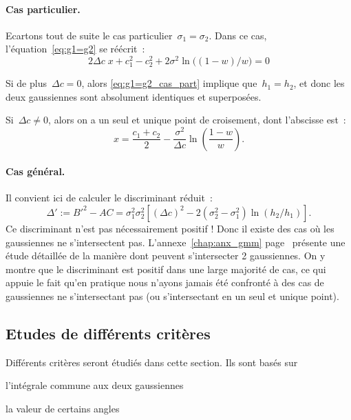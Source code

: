 \documentclass[main.tex]{subfiles}
\begin{document}
\paragraph{Cas particulier. \label{para:cas_partic_polynome}}
Ecartons tout de suite le cas particulier~$\sigma_1=\sigma_2$. %
Dans ce cas, l'équation~\eqref{eq:g1=g2} se réécrit~:
\begin{equation}
\label{eq:g1=g2_cas_part}
2\Delta c \; x + c_1^2-c_2^2 +  2 \sigma^2 \ln \big( (1-w) / w \big) = 0
\end{equation}
\begin{myitemize}
\item Si de plus~$\Delta c=0$, alors \eqref{eq:g1=g2_cas_part} implique que~$h_1=h_2$, et donc les deux gaussiennes sont absolument identiques et superposées.
\item Si~$\Delta c\neq0$, alors on a un seul et unique point de croisement, dont l'abscisse est~:
\begin{equation}
\label{eq:pt_croisement_unique}
x=\dfrac{c_1+c_2}{2}-\dfrac{\sigma^2}{\Delta c}\ln \left( \dfrac{1-w}{w} \right).
\end{equation}
\end{myitemize}
\paragraph{Cas général.} Il convient ici de calculer le discriminant réduit~:
\begin{equation}
\label{eq:discr_reduit}
\Delta' := B'^2 - AC = \sigma_1^2 \sigma_2^2 \left[ (\Delta c)^2 - 2(\sigma_2^2-\sigma_1^2) \ln (h_2/h_1)  \right].
\end{equation}
Ce discriminant n'est pas nécessairement positif ! Donc il existe des cas où les gaussiennes ne s'intersectent pas. L'annexe~\ref{chap:anx_gmm} page~\pageref{chap:anx_gmm} présente une étude détaillée de la manière dont peuvent s'intersecter 2 gaussiennes. On y montre que le discriminant est positif dans une large majorité de cas, ce qui appuie le fait qu'en pratique nous n'ayons jamais été confronté à des cas de gaussiennes ne s'intersectant pas (ou s'intersectant en un seul et unique point).

\subsection{Etudes de différents critères}
Différents critères seront étudiés dans cette section. Ils sont basés sur
\begin{myitemize}
\item l'intégrale commune aux deux gaussiennes
\item la valeur de certains angles
\end{myitemize}
\end{document}
